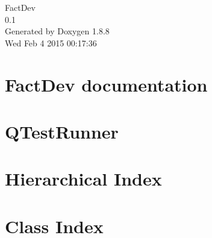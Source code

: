 \documentclass[twoside]{book}
\newcommand{\+}{\discretionary{\mbox{\scriptsize$\hookleftarrow$}}{}{}}
\newcommand{\clearemptydoublepage}{%
  \newpage{\pagestyle{empty}\cleardoublepage}%
}
\begin{document}
\hypersetup{pageanchor=false,
             bookmarks=true,
             bookmarksnumbered=true,
             pdfencoding=unicode
            }
\begin{titlepage}
\vspace*{7cm}
\begin{center}%
{\Large Fact\+Dev \\[1ex]\large 0.\+1 }\\
\vspace*{1cm}
{\large Generated by Doxygen 1.8.8}\\
\vspace*{0.5cm}
{\small Wed Feb 4 2015 00:17:36}\\
\end{center}
\end{titlepage}
\clearemptydoublepage
\tableofcontents
\clearemptydoublepage
{}
\hypersetup{pageanchor=true}

\chapter{Fact\+Dev documentation}
\label{index}\hypertarget{index}{}
\chapter{Q\+Test\+Runner}
\label{dc/d04/md_tests_QTestRunner_README}
\hypertarget{dc/d04/md_tests_QTestRunner_README}{}

\chapter{Hierarchical Index}

\chapter{Class Index}

\end{document}
